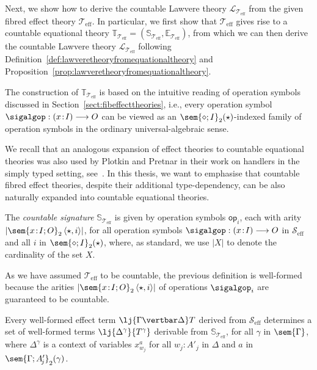 Next, we show how to derive the countable Lawvere theory $\mathcal{L}_{\mathcal{T}_{\text{eff}}}$ from the given fibred effect theory  $\mathcal{T}_{\text{eff}}$. In particular, we first show that $\mathcal{T}_{\text{eff}}$ gives rise to a countable equational theory $\mathbb{T}_{\!\mathcal{T}_{\text{eff}}} = (\mathbb{S}_{\!\mathcal{T}_{\text{eff}}},\mathbb{E}_{\!\mathcal{T}_{\text{eff}}})$, from which we can then derive the countable Lawvere theory $\mathcal{L}_{\mathcal{T}_{\text{eff}}}$ following Definition~\ref{def:lawveretheoryfromequationaltheory} and Proposition~\ref{prop:lawveretheoryfromequationaltheory}. 

The construction of $\mathbb{T}_{\mathcal{T}_{\text{eff}}}$ is based on the intuitive reading of operation symbols discussed in Section~\ref{sect:fibeffecttheories}, i.e., every operation symbol $\sigalgop : (x \!:\! I) \longrightarrow O$ can be viewed as an $\sem{\diamond;I}_2(\star)$-indexed family of operation symbols in the ordinary universal-algebraic sense. 

We recall that an analogous expansion of effect theories to countable equational theories was also used by Plotkin and Pretnar in their work on handlers in the simply typed setting, see~\cite[Section~4]{Plotkin:HandlingEffects}. In this thesis, we want to emphasise that countable fibred effect theories, despite their additional type-dependency, can be also naturally expanded into  countable equational theories.

\begin{definition}
The \emph{countable signature} $\mathbb{S}_{\mathcal{T}_{\text{eff}}}$ is given by operation symbols $\mathsf{op}_i$, each with arity $\vert \sem{x \!:\! I; O}_{2}\, \langle \star , i \rangle \vert$, for all operation symbols $\sigalgop : (x \!:\! I) \longrightarrow O$ in $\mathcal{S}_{\text{eff}}$ and all $i$ in $\sem{\diamond; I}_{2}(\star)$, where, as standard, we use $\vert X \vert$ to denote the cardinality of the set $X$.
\end{definition}

As we have assumed $\mathcal{T}_{\text{eff}}$ to be countable, the previous definition is well-formed because the arities $\vert \sem{x \!:\! I; O}_{2}\, \langle \star , i \rangle \vert$ of operations $\sigalgop_i$ are guaranteed to be countable.

\begin{proposition}
Every well-formed effect term $\lj {\Gamma \vertbar \Delta} T$ derived from ${\mathcal{S}_{\text{eff}}}$ determines a set of well-formed terms $\lj {\Delta^\gamma} {T^\gamma}$ derivable from $\mathbb{S}_{\mathcal{T}_{\text{eff}}}$, for all $\gamma$ in $\sem{\Gamma}$, where $\Delta^\gamma$ is a context of variables $x^{a}_{w_{\!j}}$ for all $w_{\!j} \!:\! A'_{\!j}$ in $\Delta$ and $a$ in $\sem{\Gamma; A'_{\!j}}_{2}(\gamma)$.
\end{proposition}

